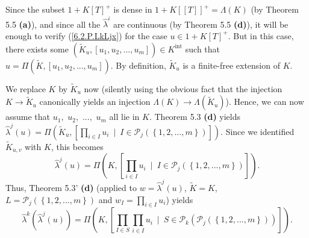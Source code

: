 \documentclass[numbers=enddot,12pt,final,onecolumn,notitlepage]{scrartcl}%
\begin{document}
Since the subset $1+K\left[  T\right]  ^{+}$ is dense in $1+K\left[  \left[
T\right]  \right]  ^{+}=\Lambda\left(  K\right)  $ (by Theorem 5.5
\textbf{(a)}), and since all the $\widehat{\lambda}^{i}$ are continuous (by
Theorem 5.5 \textbf{(d)}), it will be enough to verify (\ref{6.2.P.LkLjx}) for
the case $u\in1+K\left[  T\right]  ^{+}$. But in this case, there exists some
$\left(  \widetilde{K}_{u},\left[  u_{1},u_{2},...,u_{m}\right]  \right)  \in
K^{\operatorname*{int}}$ such that $u=\Pi\left(  \widetilde{K},\left[
u_{1},u_{2},...,u_{m}\right]  \right)  $. By definition, $\widetilde{K}_{u}$
is a finite-free extension of $K$.

We replace $K$ by $\widetilde{K}_{u}$ now (silently using the obvious fact
that the injection $K\rightarrow\widetilde{K}_{u}$ canonically yields an
injection $\Lambda\left(  K\right)  \rightarrow\Lambda\left(  \widetilde{K}%
_{u}\right)  $). Hence, we can now assume that $u_{1},$ $u_{2},$ $...,$
$u_{m}$ all lie in $K$. Theorem 5.3 \textbf{(d)} yields $\widehat{\lambda}%
^{j}\left(  u\right)  =\Pi\left(  \widetilde{K}_{u},\left[  \prod\limits_{i\in
I}u_{i}\ \mid\ I\in\mathcal{P}_{j}\left(  \left\{  1,2,...,m\right\}  \right)
\right]  \right)  $. Since we identified $\widetilde{K}_{u,v}$ with $K$, this
becomes%
\[
\widehat{\lambda}^{j}\left(  u\right)  =\Pi\left(  K,\left[  \prod
\limits_{i\in I}u_{i}\ \mid\ I\in\mathcal{P}_{j}\left(  \left\{
1,2,...,m\right\}  \right)  \right]  \right)  .
\]
Thus, Theorem 5.3' \textbf{(d)} (applied to $w=\widehat{\lambda}^{j}\left(
u\right)  $, $\widetilde{K}=K$, $L=\mathcal{P}_{j}\left(  \left\{
1,2,...,m\right\}  \right)  $ and $w_{I}=\prod\limits_{i\in I}u_{i}$) yields%
\[
\widehat{\lambda}^{k}\left(  \widehat{\lambda}^{j}\left(  u\right)  \right)
=\Pi\left(  K,\left[  \prod_{I\in S}\prod\limits_{i\in I}u_{i}\ \mid
\ S\in\mathcal{P}_{k}\left(  \mathcal{P}_{j}\left(  \left\{
1,2,...,m\right\}  \right)  \right)  \right]  \right)  .
\]
\end{document}
